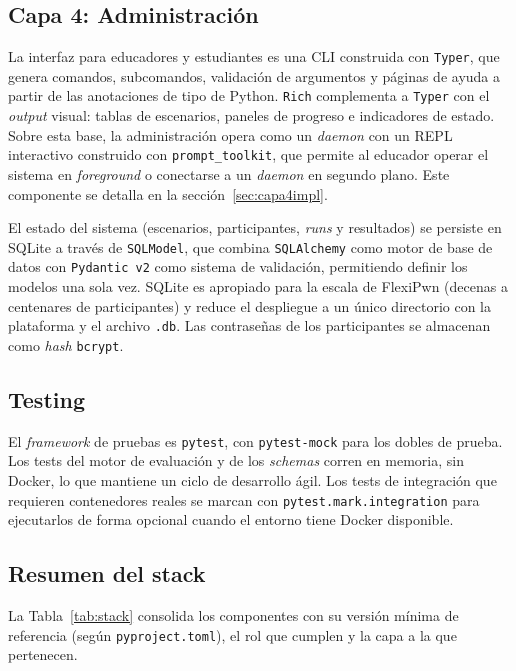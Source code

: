 \subsection{Capa 4: Administración}

La interfaz para educadores y estudiantes es una CLI construida con
\texttt{Typer}, que genera comandos, subcomandos, validación de argumentos y
páginas de ayuda a partir de las anotaciones de tipo de Python. \texttt{Rich}
complementa a \texttt{Typer} con el \textit{output} visual: tablas de
escenarios, paneles de progreso e indicadores de estado. Sobre esta base, la
administración opera como un \textit{daemon} con un REPL interactivo construido
con \texttt{prompt\_toolkit}, que permite al educador operar el sistema en
\textit{foreground} o conectarse a un \textit{daemon} en segundo plano. Este
componente se detalla en la sección~\ref{sec:capa4impl}.

El estado del sistema (escenarios, participantes, \textit{runs} y resultados) se
persiste en SQLite a través de \texttt{SQLModel}, que combina
\texttt{SQLAlchemy} como motor de base de datos con \texttt{Pydantic v2} como
sistema de validación, permitiendo definir los modelos una sola vez. SQLite es
apropiado para la escala de FlexiPwn (decenas a centenares de participantes) y
reduce el despliegue a un único directorio con la plataforma y el archivo
\texttt{.db}. Las contraseñas de los participantes se almacenan como
\textit{hash} \texttt{bcrypt}.

\subsection{Testing}

El \textit{framework} de pruebas es \texttt{pytest}, con \texttt{pytest-mock}
para los dobles de prueba. Los tests del motor de evaluación y de los
\textit{schemas} corren en memoria, sin Docker, lo que mantiene un ciclo de
desarrollo ágil. Los tests de integración que requieren contenedores reales se
marcan con \texttt{pytest.mark.integration} para ejecutarlos de forma opcional
cuando el entorno tiene Docker disponible.

\subsection{Resumen del stack}

La Tabla~\ref{tab:stack} consolida los componentes con su versión mínima de
referencia (según \texttt{pyproject.toml}), el rol que cumplen y la capa a la
que pertenecen.

